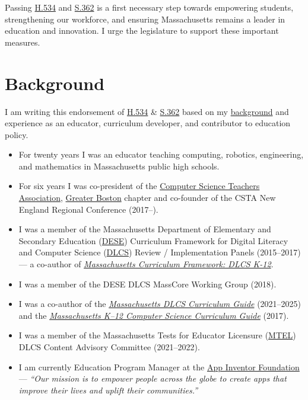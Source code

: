 \documentclass[12pt]{article}%
\begin{document}
Passing \href{https://malegislature.gov/Bills/194/H534}{H.534} and \href{https://malegislature.gov/Bills/194/S362}{S.362} is a first necessary step towards empowering students, strengthening our workforce, and ensuring Massachusetts remains a leader in education and innovation. I urge the legislature to support these important measures.

\section{Background}
\label{Background}

I am writing this endorsement of \href{https://malegislature.gov/Bills/194/H534}{H.534} \& \href{https://malegislature.gov/Bills/194/S362}{S.362} based on my \href{https://dcpetty.dev/cv/}{background} and experience as an educator, curriculum developer, and contributor to education policy. 

\begin{itemize}
\item For twenty years I was an educator teaching computing, robotics, engineering, and mathematics in Massachusetts public high schools.
\item For six years I was co-president of the \href{https://csteachers.org}{Computer Science Teachers Association}, \href{https://community.csteachers.org/cstamassachusetts/}{Greater Boston} chapter and co-founder of the CSTA New England Regional Conference (2017–).
\item I was a member of the Massachusetts Department of Elementary and Secondary Education (\href{https://www.doe.mass.edu/}{DESE}) Curriculum Framework for Digital Literacy and Computer Science (\href{https://www.doe.mass.edu/stem/dlcs/}{DLCS}) Review / Implementation Panels (2015–2017) --- a co-author of \textit{\href{https://www.doe.mass.edu/frameworks/dlcs.pdf}{Massachusetts Curriculum Framework: DLCS K-12}}.
\item I was a member of the DESE DLCS MassCore Working Group (2018). 
\item I was a co-author of the \textit{\href{https://www.doe.mass.edu/stem/dlcs/curriculum-guide.pdf}{Massachusetts DLCS Curriculum Guide}} (2021–2025) and the \textit{\href{https://edc.org/resources/massachusetts-k-12-computer-science-curriculum-guide/}{Massachusetts K–12 Computer Science Curriculum Guide}} (2017).
\item I was a member of the Massachusetts Tests for Educator Licensure (\href{https://www.doe.mass.edu/mtel/}{MTEL}) DLCS Content Advisory Committee (2021–2022).
\item I am currently Education Program Manager at the \href{https://appinventorfoundation.org/}{App Inventor Foundation} --- \textit{``Our mission is to empower people across the globe to create apps that improve their lives and uplift their communities.''}
\end{itemize}
\end{document}
